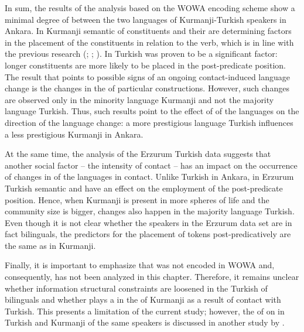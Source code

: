 \documentclass[output=paper,colorlinks,citecolor=brown]{langscibook}
\begin{document}
In sum, the results of the analysis based on the WOWA encoding scheme show a minimal degree of  between the two languages of Kurmanji-Turkish speakers in Ankara. In Kurmanji semantic  of constituents and their  are determining factors in the placement of the constituents in relation to the verb, which is in line with the previous research (\citealt{haig_verb-goal_2015}; \citealt{haig2018northern}; \citealt{gundogdu2019asymmetries}). In Turkish  was proven to be a significant factor: longer constituents are more likely to be placed in the post-predicate position. The result that points to possible signs of an ongoing contact-induced language change is the changes in the  of particular constructions. However, such changes are observed only in the minority language Kurmanji and not the majority language Turkish. Thus, such results point to the effect of  of the languages on the direction of the language change: a more prestigious language Turkish influences a less prestigious Kurmanji in Ankara.

At the same time, the analysis of the Erzurum Turkish data suggests that another social factor – the intensity of contact – has an impact on the occurrence of changes in  of the languages in contact. Unlike Turkish in Ankara, in Erzurum Turkish semantic  and  have an effect on the employment of the post-predicate position. Hence, when Kurmanji is present in more spheres of life and the community size is bigger, changes also happen in the majority language Turkish. Even though it is not clear whether the speakers in the Erzurum data set are in fact bilinguals, the predictors for the placement of tokens post-predicatively are the same as in Kurmanji.

Finally, it is important to emphasize that  was not encoded in WOWA and, consequently, has not been analyzed in this chapter. Therefore, it remains unclear whether information structural constraints are loosened in the Turkish of bilinguals and whether  plays a  in the  of Kurmanji as a result of contact with Turkish. This presents a limitation of the current study; however, the  of  on  in Turkish and Kurmanji of the same speakers is discussed in another study by \citet{iefremenko2023wordorder}.
\end{document}
